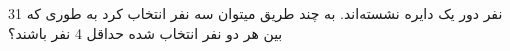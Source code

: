 31 نفر دور یک دایره نشسته‌اند. 
به چند طریق میتوان سه نفر انتخاب کرد به طوری که بین هر دو نفر انتخاب شده حداقل 4 نفر باشند؟